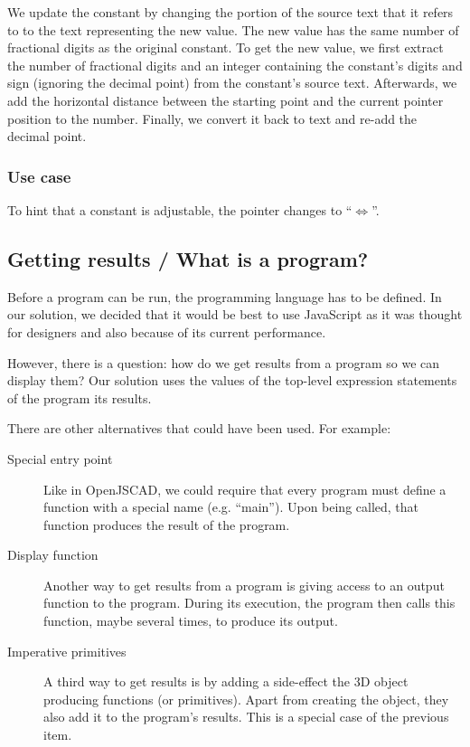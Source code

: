 We update the constant by changing the portion of the source text that it refers to to the text representing the new value.
The new value has the same number of fractional digits as the original constant.
To get the new value, we first extract the number of fractional digits and an integer containing the constant's digits and sign (ignoring the decimal point) from the constant's source text.
Afterwards, we add the horizontal distance between the starting point and the current pointer position to the number.
Finally, we convert it back to text and re-add the decimal point.

\subsubsection{Use case}
To hint that a constant is adjustable, the pointer changes to ``$\Leftrightarrow$''.

\subsection{Getting results / What is a program?}
Before a program can be run, the programming language has to be defined.
In our solution, we decided that it would be best to use JavaScript as it was thought for designers and also because of its current performance.

However, there is a question: how do we get results from a program so we can display them?
Our solution uses the values of the top-level expression statements of the program its results.

There are other alternatives that could have been used.
For example:
\begin{description}
  \item[Special entry point] Like in OpenJSCAD, we could require that every program must define a function with a special name (e.g. ``main''). Upon being called, that function produces the result of the program.
  \item[Display function] Another way to get results from a program is giving access to an output function to the program. During its execution, the program then calls this function, maybe several times, to produce its output.
  \item[Imperative primitives] A third way to get results is by adding a side-effect the 3D object producing functions (or primitives). Apart from creating the object, they also add it to the program's results. This is a special case of the previous item.
\end{description}

